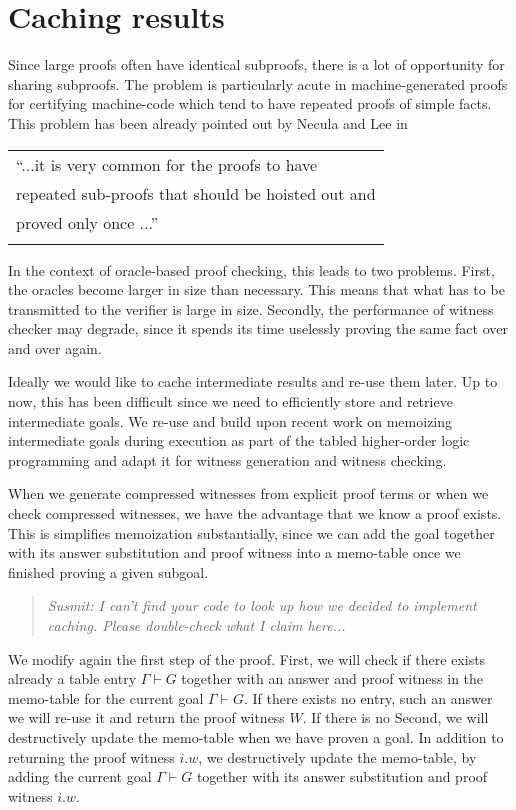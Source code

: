 \documentclass{acmconf}
\newcommand{\vd}{\vdash}
\newenvironment{note}{\begin{quote}\message{note!}\it}{\end{quote}}
\begin{document}
\section{Caching results}
\label{sec:tabling}
Since large proofs often have identical subproofs,  there is a
lot of opportunity for sharing subproofs. The problem is particularly
acute in machine-generated proofs for certifying machine-code which
tend to have repeated proofs of simple facts. This problem has been
already pointed out by Necula and Lee in \cite{NeculaLee+97:resource}

 \begin{tabular}[h]{l}
``...it is very common for the proofs to have  \\
repeated sub-proofs that should be hoisted out and \\
proved only once ...'' \cite{NeculaLee+97:resource}\\ $\;$
 \end{tabular}


In the context of oracle-based proof checking, this leads to two
problems.  First, the oracles become larger in size than
necessary. This means that what has to be transmitted to the verifier
is large in size. Secondly, the performance of witness checker may
degrade, since it spends its time uselessly proving the same fact over
and over again. 

Ideally we would like to cache intermediate results and re-use them
later. Up to now, this has been difficult since we need to efficiently
store and retrieve intermediate goals. We re-use and build upon recent
work \cite{pientka:tabled} on memoizing intermediate goals during
execution as part of the tabled higher-order logic programming and
adapt it for witness generation and witness checking. 

When we generate compressed witnesses from explicit proof terms or
when we check compressed witnesses, we have the advantage that we know
a proof exists. This is simplifies memoization substantially, since we
can add the goal together with its answer substitution and proof
witness into a memo-table once we finished proving a given subgoal. 
\begin{note}
  Susmit: I can't find your code to look up how we decided to
  implement caching. Please double-check what I claim here...
\end{note}

We modify again the first step of the proof. First, we will check if there
exists already a table entry $\Gamma \vd G$ together with an answer
and proof witness in the memo-table for the current goal $\Gamma \vd
G$. If there exists no entry, such an answer we will re-use it and return the
proof witness $W$. If there is no 
Second, we will destructively update
the memo-table when we have proven a goal. In addition to returning
the proof witness $i . w$, we destructively update the memo-table, by adding the current goal
$\Gamma \vd G$ together with its answer substitution and proof witness
$i . w$.  
\end{document}
